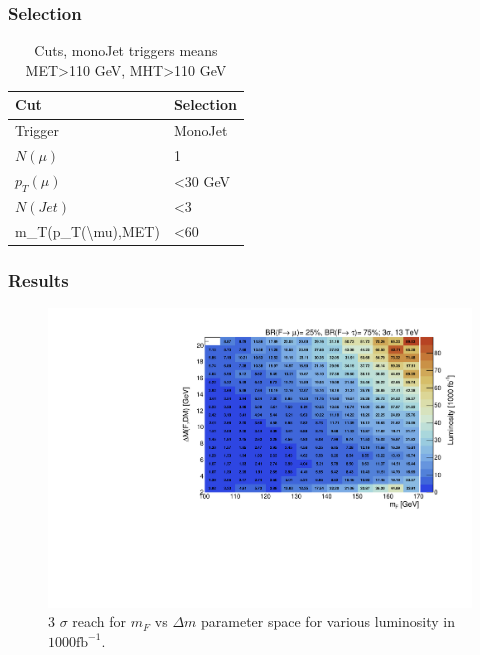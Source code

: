 \documentclass{beamer}
\begin{document}
\begin{frame}

\frametitle{Selection}


\begin{table}[]
	{\centering
		\begin{tabular}{ll}
			\hline
			\textbf{Cut}                       & \textbf{Selection}                                           \\\hline
			Trigger                            & MonoJet  \\
			$N(\mu)$                           & 1                                                            \\
			$p_T(\mu)$                         & \textless{}30 GeV                                            \\
			$N(Jet)$                           & \textless{}3                                                 \\
			m\_T(p\_T(\textbackslash{}mu),MET) & \textless{}60                                             \\ \hline
		\end{tabular}
		
		\caption{Cuts, monoJet triggers means MET\textgreater{}110 GeV, MHT\textgreater{}110 GeV}
		\label{CutsTable}
	}
\end{table}



\end{frame}

\begin{frame}
\frametitle{Results}

\begin{figure}
	\centering
	\includegraphics[scale=0.45]{pictures/LumiToExclusionSigma3_BRmu25tau75} 
	\caption{3 $\sigma$ reach for $m_{F}$ vs  $\Delta m$ parameter space for various luminosity in $1000\text{fb}^{-1}$. }
	\label{results}
\end{figure}

\end{frame}
\end{document}
